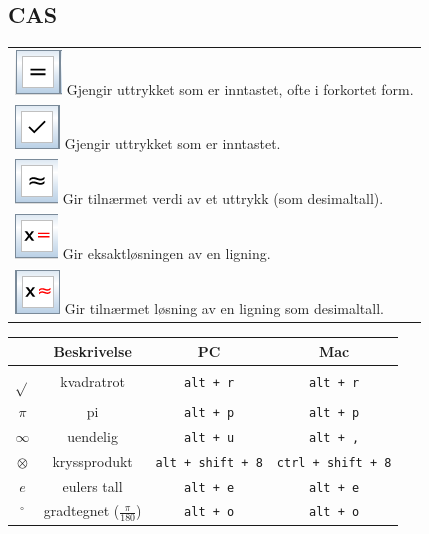 \subsection*{CAS}
\begin{tabular}{@{}l}
	\;\includegraphics[scale=0.4]{fig/erlik} Gjengir uttrykket som er inntastet, ofte i forkortet form.\\	
	\;\includegraphics[scale=0.4]{fig/brin} Gjengir uttrykket som er inntastet.\\	
	\;\includegraphics[scale=0.4]{fig/caerlik} Gir tilnærmet verdi av et uttrykk (som desimaltall). \\	
	\;\includegraphics[scale=0.4]{fig/x} Gir eksaktløsningen av en ligning.\\
	\;\includegraphics[scale=0.4]{fig/xca} Gir tilnærmet løsning av en ligning som desimaltall.\\

\end{tabular}

\begin{tabular}{@{}c | c |c | c }
	&\textbf{Beskrivelse} & \textbf{PC }& \textbf{Mac} \\ \hline
	$ \sqrt{} $	& kvadratrot& \texttt{alt\,+\,r} &\texttt{alt\,+\,r} \\\hline
	$ \pi $	& pi& \texttt{alt\,+\,p} & \texttt{alt\,+\,p}\\\hline
	$ \infty $ &uendelig& \texttt{alt\,+\,u} &\texttt{alt\,+\,,}  \\\hline
	$ \otimes $&kryssprodukt & \texttt{alt\,+\,shift\,+\,8}&\texttt{ctrl\,+\,shift\,+\,8} \\\hline
	$ e $&eulers tall & \texttt{alt\,+\,e}& \texttt{alt\,+\,e}\\\hline
	$ {}^\circ $&gradtegnet ($ \frac{\pi}{180} $) & \texttt{alt\,+\,o}& \texttt{alt\,+\,o}
	\\\hline	
\end{tabular}

